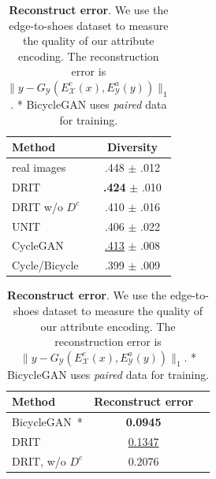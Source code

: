 \documentclass[runningheads]{llncs}
\begin{document}
\begin{table}[tb]
    \begin{minipage}[t]{.45\linewidth}
      \caption{\textbf{Diversity.} We use the LPIPS metric~\cite{zhang2018perceptual} to measure the diversity of generated images on the Yosemite dataset. 
      }
	\label{tab:diversity}
      \centering
    \begin{tabular}{l c}
    \toprule
    Method & Diversity \\
    \midrule
    real images & .448 $\pm$ .012 \\
    \midrule
    DRIT &  \textbf{.424} $\pm$ .010 \\
    DRIT w/o $D^c$ & .410  $\pm$ .016\\
    UNIT~\cite{liu2017unit} & .406 $\pm$ .022\\
    CycleGAN~\cite{zhu2017cyclegan} & \underline{.413} $\pm$ .008\\
    Cycle/Bicycle & .399 $\pm$ .009\\
    \bottomrule
    \end{tabular}
    \end{minipage}%
    \hfill
    \begin{minipage}[t]{.45\linewidth}
        \caption{\textbf{Reconstruct error}. We use the edge-to-shoes dataset to measure the quality of our attribute encoding. The reconstruction error is $\lVert y-G_\mathcal{Y}(E_\mathcal{X}^c(x), E_\mathcal{Y}^a(y))\lVert_{1}$. * BicycleGAN uses \emph{paired} data for training.
}
	\label{tab:recon}
    \centering
	\begin{tabular}{l cc} 
    	\toprule
		Method & Reconstruct error\\
        \midrule
        BicycleGAN~\cite{zhu2017bicyclegan}* & \textbf{0.0945} \\
        \midrule 
        DRIT & \underline{0.1347}\\
        DRIT,  w/o $D^c$& 0.2076\\
		\bottomrule
	\end{tabular}
    \end{minipage} 
    \vspace{-1mm}
\end{table}
\end{document}
